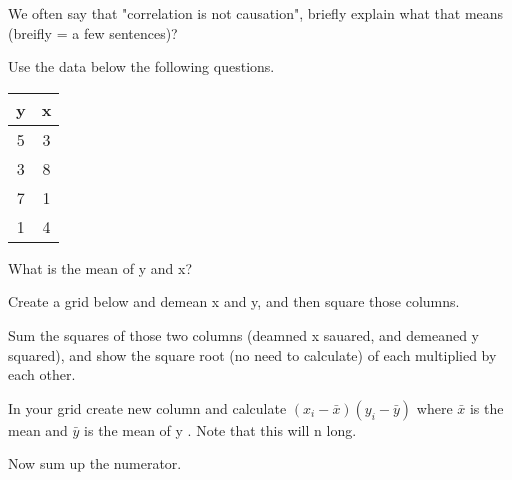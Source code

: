 \documentclass[11pt]{article}
\begin{document}
We often say that "correlation is not causation",  briefly explain what that means (breifly = a few sentences)? 
\newline  
\newline
\newline 

\newpage

Use the data below the following questions. 

\begin{center}
\begin{tabular}{ |c|c|} 
 \hline
 y & x  \\ 
 \hline
 5 & 3  \\ 
 3 & 8  \\ 
 7 & 1  \\ 
 1 & 4  \\ 
 \hline
\end{tabular}
\end{center}

What is the mean of y and x? 
\newline  
\newline
\newline 

Create a grid below and demean x and y, and then square those columns. 
\newline  
\newline
\newline 
\newline  
\newline
\newline 
\newline  
\newline
\newline 

Sum the squares of those two columns (deamned x sauared, and demeaned y squared), and show the square root (no need to calculate) of each multiplied by each other. 
\newline 
\newline  
\newline
\newline 


In your grid create new column and calculate $ (x_i - \bar{x})(y_i - \bar{y})$ where $\bar{x}$ is the mean and $\bar{y}$ is the mean of y  . Note that this will n long. 
\newline 
\newline  
\newline
\newline 

Now sum up the numerator. 
\newline 
\newline  
\newline
\newline 
\end{document}
